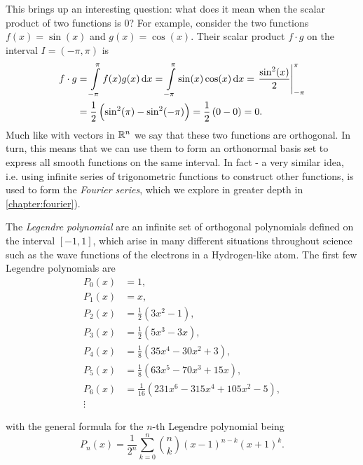 This brings up an interesting question: what does it mean when the scalar product of two functions is $0$? For example, consider the two functions $f(x)=\sin(x)$ and $g(x)=\cos(x)$. Their scalar product $f\cdot g$ on the interval $I=\left(-\pi,\pi\right)$ is
	\begin{align*}
		f\cdot g &= \int\limits_{-\pi}^{\pi}f(x)g(x)\dif x  = \int\limits_{-\pi}^{\pi}\sin(x)\cos(x)\dif x  = \left.\frac{\sin^{2}(x)}{2}\right|_{-\pi}^{\pi}\nonumber\\
				 &= \frac{1}{2} \left( \sin^{2}(\pi)-\sin^{2}(-\pi) \right)  = \frac{1}{2} \left( 0-0 \right)  = 0.
	\end{align*}
	Much like with vectors in $\Rs[n]$ we say that these two functions are orthogonal. In turn, this means that we can use them to form an orthonormal basis set to express all smooth functions on the same interval. In fact - a very similar idea, i.e. using infinite series of trigonometric functions to construct other functions, is used to form the \emph{Fourier series}, which we explore in greater depth in \autoref{chapter:fourier}).

	The \emph{Legendre polynomial} are an infinite set of orthogonal polynomials defined on the interval $[-1,1]$, which arise in many different situations throughout science such as the wave functions of the electrons in a Hydrogen-like atom. The first few Legendre polynomials are
	\begin{align}
		P_{0}(x) &= 1,\nonumber\\
		P_{1}(x) &= x,\nonumber\\
		P_{2}(x) &= \frac{1}{2}\left(3x^{2}-1\right),\nonumber\\
		P_{3}(x) &= \frac{1}{2}\left(5x^{3}-3x\right),\nonumber\\
		P_{4}(x) &= \frac{1}{8}\left(35x^{4}-30x^{2}+3\right),\nonumber\\
		P_{5}(x) &= \frac{1}{8}\left(63x^{5}-70x^{3}+15x\right),\nonumber\\
		P_{6}(x) &= \frac{1}{16}\left(231x^{6}-315x^{4}+105x^{2}-5\right),\\
		\vdots\nonumber
		\label{eq:Legendre_polynomials_first_7}
	\end{align}

	with the general formula for the $n$-th Legendre polynomial being
	\begin{equation}
		P_{n}(x) = \frac{1}{2^{n}}\sum\limits_{k=0}^{n}\binom{n}{k}\left(x-1\right)^{n-k}\left(x+1\right)^{k}.
		\label{eq:Legendre_polynomial_general}
	\end{equation}

